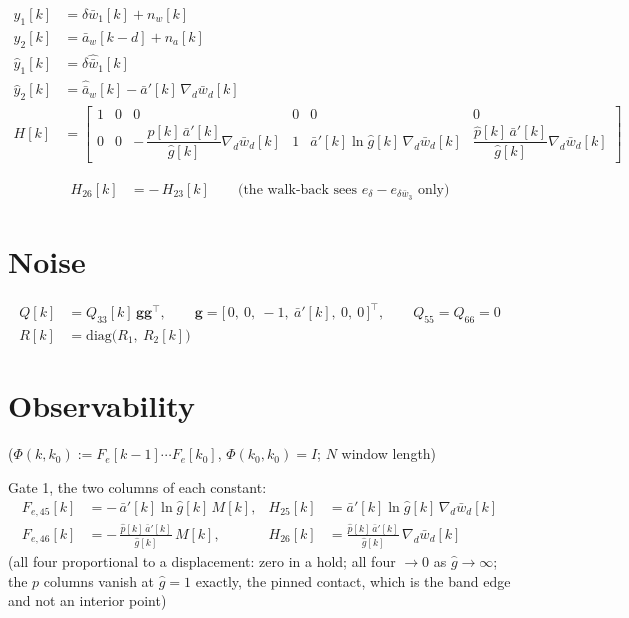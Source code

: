 \documentclass[11pt,a4paper,fontset=none]{ctexart}
\newcommand{\ba}{\bar{a}}
\newcommand{\bw}{\bar{w}}
\newcommand{\ap}{\ba'}
\newcommand{\ah}{\hat{\ba}_w}
\newcommand{\ph}{\hat{p}}
\newcommand{\dl}{\delta}
\newcommand{\gh}{\hat{g}}
\begin{document}
\begin{align*}
y_1[k]      &= \delta\bw_1[k] + n_w[k] \\
y_2[k]      &= \ba_w[k-d] + n_a[k] \\
\hat y_1[k] &= \delta\hat{\bw}_1[k] \\
\hat y_2[k] &= \ah[k] - \ap[k]\,\nabla_d\bw_d[k] \\[4pt]
H[k]        &= \begin{bmatrix} 1 & 0 & 0 & 0 & 0 & 0 \\[2pt]
               0 & 0 & -\,\dfrac{\ph[k]\,\ap[k]}{\gh[k]}\nabla_d\bw_d[k] & 1 & \ap[k]\ln\gh[k]\,\nabla_d\bw_d[k] & \dfrac{\ph[k]\,\ap[k]}{\gh[k]}\nabla_d\bw_d[k] \end{bmatrix}
\end{align*}

\begin{align*}
H_{26}[k] &= -\,H_{23}[k] \qquad\text{(the walk-back sees } e_{\dl} - e_{\delta\bw_3}\text{ only)}
\end{align*}

\section{Noise}

\begin{align*}
Q[k]      &= Q_{33}[k]\,\mathbf{g}\mathbf{g}^{\top}, \qquad \mathbf{g} = \bigl[\,0,\ 0,\ -1,\ \ap[k],\ 0,\ 0\,\bigr]^{\top}, \qquad Q_{55} = Q_{66} = 0 \\
R[k]      &= \mathrm{diag}\bigl(R_1,\ R_2[k]\bigr)
\end{align*}

\section{Observability}

($\Phi(k,k_0) := F_e[k-1]\cdots F_e[k_0]$, $\Phi(k_0,k_0) = I$; $N$ window length)

Gate 1, the two columns of each constant:
\begin{align*}
F_{e,45}[k] &= -\,\ap[k]\ln\gh[k]\,M[k],                 & H_{25}[k] &= \ap[k]\ln\gh[k]\,\nabla_d\bw_d[k] \\
F_{e,46}[k] &= -\,\frac{\ph[k]\,\ap[k]}{\gh[k]}\,M[k],   & H_{26}[k] &= \frac{\ph[k]\,\ap[k]}{\gh[k]}\,\nabla_d\bw_d[k]
\end{align*}
(all four proportional to a displacement: zero in a hold; all four $\to 0$ as $\gh \to \infty$; the $p$ columns vanish at $\gh = 1$
exactly, the pinned contact, which is the band edge and not an interior point)
\end{document}
